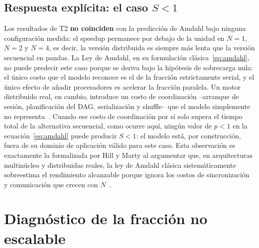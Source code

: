 \documentclass[10pt,journal]{IEEEtran}
\begin{document}
\subsection{Respuesta expl\'icita: el caso $S<1$}
Los resultados de T2 \textbf{no coinciden} con la predicci\'on de Amdahl bajo
ninguna configuraci\'on medida: el speedup permanece por debajo de la unidad
en $N=1$, $N=2$ y $N=4$, es decir, la versi\'on distribuida es siempre m\'as
lenta que la versi\'on secuencial en pandas. La Ley de Amdahl, en su
formulaci\'on cl\'asica~\eqref{eq:amdahl}, no puede predecir este caso porque
se deriva bajo la hip\'otesis de sobrecarga nula: el \'unico costo que el
modelo reconoce es el de la fracci\'on estrictamente serial, y el \'unico
efecto de a\~nadir procesadores es acelerar la fracci\'on paralela. Un motor
distribuido real, en cambio, introduce un costo de coordinaci\'on --arranque
de sesi\'on, planificaci\'on del DAG, serializaci\'on y shuffle-- que el
modelo simplemente no representa~\cite{hillmarty2008}. Cuando ese costo de
coordinaci\'on por s\'i solo supera el tiempo total de la alternativa
secuencial, como ocurre aqu\'i, ning\'un valor de $p<1$ en la
ecuaci\'on~\eqref{eq:amdahl} puede producir $S<1$: el modelo est\'a, por
construcci\'on, fuera de su dominio de aplicaci\'on v\'alido para este caso.
Esta observaci\'on es exactamente la formalizada por Hill y Marty al
argumentar que, en arquitecturas multin\'ucleo y distribuidas reales, la ley
de Amdahl cl\'asica sistem\'aticamente sobreestima el rendimiento alcanzable
porque ignora los costos de sincronizaci\'on y comunicaci\'on que crecen con
$N$~\cite{hillmarty2008}.

\section{Diagn\'ostico de la fracci\'on no escalable}
\label{sec:diagnostico}
\end{document}
